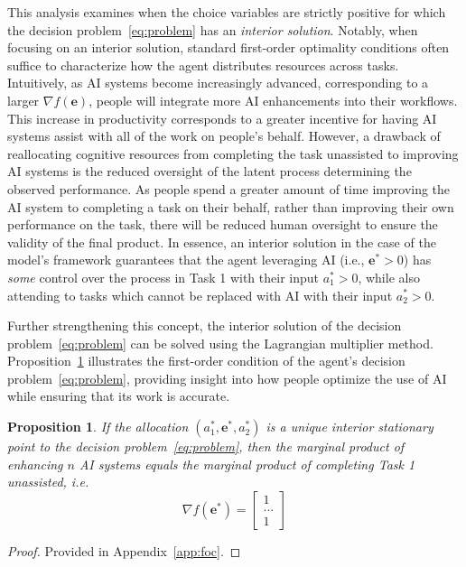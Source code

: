 \documentclass[11pt]{article}
\newtheorem{proposition}{Proposition}
\theoremstyle{definition}
\theoremstyle{remark}
\begin{document}
This analysis examines when the choice variables are strictly positive for which the decision problem~\ref{eq:problem} has an \textit{interior solution}. Notably, when focusing on an interior solution, standard first-order optimality conditions often suffice to characterize how the agent distributes resources across tasks. Intuitively, as AI systems become increasingly advanced, corresponding to a larger $\nabla f(\mathbf{e})$, people will integrate more AI enhancements into their workflows. This increase in productivity corresponds to a greater incentive for having AI systems assist with all of the work on people's behalf. However, a drawback of reallocating cognitive resources from completing the task unassisted to improving AI systems is the reduced oversight of the latent process determining the observed performance. As people spend a greater amount of time improving the AI system to completing a task on their behalf, rather than improving their own performance on the task, there will be reduced human oversight to ensure the validity of the final product. In essence, an interior solution in the case of the model's framework guarantees that the agent leveraging AI (i.e., $\mathbf{e}^*>0$) has \textit{some} control over the process in Task 1 with their input $a_1^*>0$, while also attending to tasks which cannot be replaced with AI with their input $a^*_2>0$.

Further strengthening this concept, the interior solution of the decision problem~\ref{eq:problem} can be solved using the Lagrangian multiplier method. Proposition~\ref{pro:foc} illustrates the first-order condition of the agent's decision problem~\ref{eq:problem}, providing insight into how people optimize the use of AI while ensuring that its work is accurate.

\begin{proposition}
\label{pro:foc}
If the allocation $(a^*_1,\mathbf{e}^*,a^*_2)$ is a unique interior stationary point to the decision problem~\ref{eq:problem}, then the marginal product of enhancing $n$ AI systems equals the marginal product of completing Task 1 unassisted, i.e.
$$\nabla f(\mathbf{e}^*)=\begin{bmatrix}
1\\
...\\
1
\end{bmatrix}$$
\end{proposition}
\begin{proof}
Provided in Appendix~\ref{app:foc}.
\end{proof}
\end{document}
